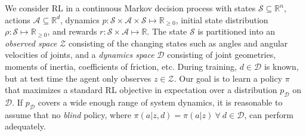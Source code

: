 \documentclass{article}
\newcommand{\R}{\mathbb{R}}
\newcommand{\E}{\mathbb{E}}
\newcommand{\TODO}[1]{\textcolor{red}{\textbf{TODO: #1}}}
\newcommand{\cA}{\mathcal{A}}
\newcommand{\cS}{\mathcal{S}}
\DeclareMathOperator*{\argmax}{argmax}
\newcommand{\sysid}{dynamics}
\newcommand{\blind}{\emph{blind}}
\newcommand{\obset}{\mathcal{Z}}
\newcommand{\idset}{\mathcal{D}}
\newcommand{\obvar}{z}
\newcommand{\idvar}{d}
\newcommand{\idpdf}{p_{\idset}}
\begin{document}
We consider RL in a continuous Markov decision process
with states $\cS \subseteq \R^n$,
actions $\cA \subseteq \R^d$,
dynamics $p : \cS \times \cA \times \cS \mapsto \R_{\geq 0}$,
initial state distribution $\rho : \cS \mapsto \R_{\geq 0}$,
and rewards $r : \cS \times \cA \mapsto \R$.
%
The state $\cS$ is partitioned into
an \emph{observed space} $\obset$
consisting of the changing states such as angles and angular velocities of joints,
and a \emph{\sysid{} space} $\idset$
consisting of joint geometries, moments of inertia, coefficients of friction, etc.
During training, $\idvar \in \idset$ is known, %
but at test time the agent only observes $\obvar \in \obset$.
Our goal is to learn a policy $\pi$ %
that maximizes a standard RL objective in expectation over a distribution $\idpdf$ on $\idset$.
If $\idpdf$ covers a wide enough range of system dynamics,
it is reasonable to assume that no \blind{} policy,
where $\pi(a|\obvar,\idvar) = \pi(a|\obvar)\ \forall\ \idvar \in \idset$,
can perform adequately.
\end{document}
